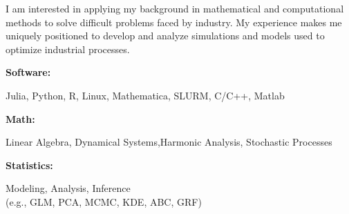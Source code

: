 \documentclass[9pt]{developercv} %
\begin{document}
\vspace{-5 pt}
\begin{minipage}[t]{0.46\textwidth}
	\vspace{-6pt}

	I am interested in applying my background in mathematical and computational methods to solve difficult problems faced by industry. My experience makes me uniquely positioned to develop and analyze simulations and models used to optimize industrial processes. \\
 
\end{minipage}
\hfill %
\begin{minipage}[t]{0.465\textwidth}
    \vspace{-6pt}
    
    \begin{minipage}[t]{0.2\textwidth}
        \textbf{Software:}
    \end{minipage}
    \hfill
    \begin{minipage}[t]{0.75\textwidth}
      Julia, Python, R, Linux, Mathematica, SLURM, C/C++, Matlab
    \end{minipage}
    \vspace{4mm}

    \vspace{-5 pt}
    \begin{minipage}[t]{0.2\textwidth}
        \textbf{Math:}
    \end{minipage}
    \hfill
    \begin{minipage}[t]{0.75\textwidth}
      Linear Algebra, Dynamical Systems,\newline Harmonic Analysis, Stochastic Processes
    \end{minipage}
    \vspace{4mm}

    \vspace{-5 pt}
    \begin{minipage}[t]{0.2\textwidth}
        \textbf{Statistics:}
    \end{minipage}
    \hfill
    \begin{minipage}[t]{0.75\textwidth}
      Modeling, Analysis, Inference
      \\ (e.g., GLM, PCA, MCMC, KDE, ABC, GRF)
    \end{minipage}
    
\end{minipage}
\end{document}
